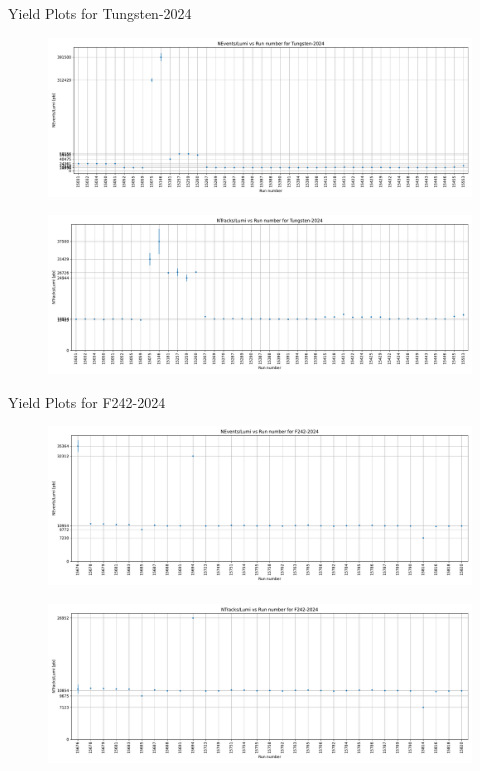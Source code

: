 \begin{frame}{Yield Plots for Tungsten-2024}
	\begin{figure}
		\includegraphics[height=0.4\textheight]{RunwisePlots/Tungsten-2024_NEventsbyLumi.pdf}
	\end{figure}
	\begin{figure}
		\includegraphics[height=0.4\textheight]{RunwisePlots/Tungsten-2024_NTracksbyLumi.pdf}
	\end{figure}
\end{frame}

\begin{frame}{Yield Plots for F242-2024}
	\begin{figure}
		\includegraphics[height=0.4\textheight]{RunwisePlots/F242-2024_NEventsbyLumi.pdf}
	\end{figure}
	\begin{figure}
		\includegraphics[height=0.4\textheight]{RunwisePlots/F242-2024_NTracksbyLumi.pdf}
	\end{figure}
\end{frame}

